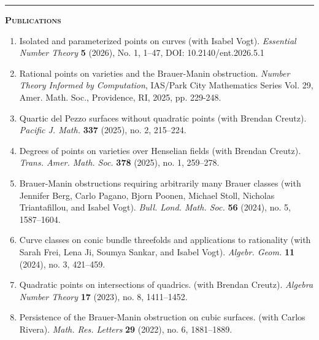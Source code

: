 \documentclass[12pt]{article}
\newcommand{\sectionheading}[1]
	{\bigskip %
	\noindent
	\hspace{-6.5mm}\textcolor{Gray}{\rule[.75mm]{21.5mm}{1mm}} %
	\hspace{.2mm}	%
	{\large{\textbf{\textsc{#1}}}} %
}
\begin{document}
	\sectionheading{Publications}%
		
	
		\begin{enumerate}[itemsep=-1mm, leftmargin=24mm]
		
			\item Isolated and parameterized points on curves (with Isabel Vogt). \textit{Essential Number Theory} \textbf{5} (2026), No. 1, 1--47, DOI: 10.2140/ent.2026.5.1

			\item 
Rational points on varieties and the Brauer-Manin obstruction. \textit{Number Theory Informed by Computation}, IAS/Park City Mathematics Series
Vol. 29, Amer. Math. Soc., Providence, RI, 2025, pp. 229-248.
 			
			\item   Quartic del Pezzo surfaces without quadratic points (with Brendan Creutz). \textit{Pacific J. Math.} \textbf{337} (2025), no. 2, 215--224.
 
			\item Degrees of points on varieties over Henselian fields (with Brendan Creutz). \textit{Trans. Amer. Math. Soc.} \textbf{378} (2025), no. 1, 259--278.

			\item Brauer-Manin obstructions requiring arbitrarily many Brauer classes (with Jennifer
Berg, Carlo Pagano, Bjorn Poonen, Michael Stoll, Nicholas Triantafillou, and Isabel Vogt). \textit{Bull. Lond. Math. Soc.} \textbf{56} (2024), no. 5, 1587--1604.
		
			\item Curve classes on conic bundle threefolds and applications to rationality
(with Sarah Frei, Lena Ji, Soumya Sankar, and Isabel Vogt).  \textit{Algebr. Geom.} \textbf{11} (2024), no. 3, 421--459.
    
    
		
		    \item Quadratic points on intersections of quadrics. (with Brendan Creutz). \textit{Algebra Number Theory} \textbf{17} (2023), no. 8, 1411--1452.            


 			\item Persistence of the Brauer-Manin obstruction on cubic surfaces. (with Carlos Rivera).  \textit{Math. Res. Letters} \textbf{29} (2022), no. 6, 1881--1889.               


\end{enumerate}
\end{document}

